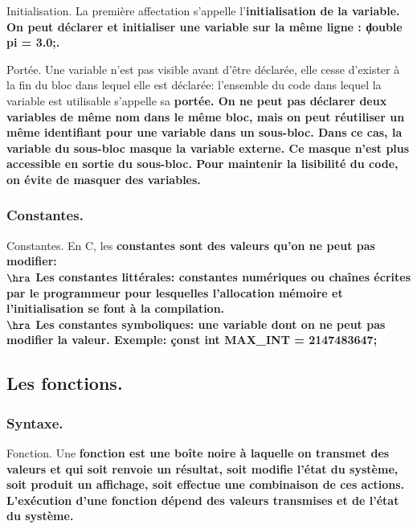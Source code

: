 \documentclass[french, 11pt]{article}
\begin{document}
\vspace*{-0.7cm}

\begin{defi}{Initialisation.}{}
    La première affectation s'appelle l'\bf{initialisation} de la variable.\\
    On peut déclarer et initialiser une variable sur la même ligne : \c{double pi = 3.0;}.
\end{defi}

\vspace*{-0.7cm}

\begin{defi}{Portée.}{}
    Une variable n'est pas visible avant d'être déclarée, elle cesse d'exister à la fin du bloc dans lequel elle est déclarée: l'ensemble du code dans lequel la variable est utilisable s'appelle sa \bf{portée}.\n
    On ne peut pas déclarer deux variables de même nom dans le même bloc, mais on peut réutiliser un même identifiant pour une variable dans un sous-bloc. Dans ce cas, la variable du sous-bloc masque la variable externe. Ce masque n'est plus accessible en sortie du sous-bloc.\n
    Pour maintenir la lisibilité du code, on évite de masquer des variables.
\end{defi}

\subsubsection{Constantes.}

\begin{defi}{Constantes.}{}
    En C, les \bf{constantes} sont des valeurs qu'on ne peut pas modifier:\\
    $\hra$ Les constantes littérales: constantes numériques ou chaînes écrites par le programmeur pour lesquelles l'allocation mémoire et l'initialisation se font à la compilation.\\
    $\hra$ Les constantes symboliques: une variable dont on ne peut pas modifier la valeur.\n
    \bf{Exemple:} \c{const int MAX_INT = 2147483647;}
\end{defi}

\subsection{Les fonctions.}
\subsubsection{Syntaxe.}

\begin{defi}{Fonction.}{}
    Une \bf{fonction} est une boîte noire à laquelle on transmet des valeurs et qui soit renvoie un résultat, soit modifie l'état du système, soit produit un affichage, soit effectue une combinaison de ces actions.\n
    L'exécution d'une fonction dépend des valeurs transmises et de l'état du système.
\end{defi}
\end{document}

